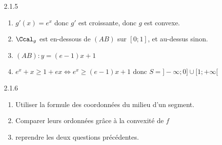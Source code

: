\begin{Solution}{2.1.5}
	\begin{enumerate}
		\item $g'(x)=e^x$ donc $g'$ est croissante, donc $g$ est convexe.
		\item $\Ccal_g$ est en-dessous de $(AB)$ sur $[0;1]$, et au-dessus sinon.
		\item $(AB):y=(e-1)x+1$
		\item $e^x+x\geq1+ex \Leftrightarrow e^x\geq(e-1)x+1$ donc $S=]-\infty;0]\cup[1;+\infty[$
	\end{enumerate}
\end{Solution}
\begin{Indication}{2.1.6}
	\begin{enumerate}
		\item[3.] Utiliser la formule des coordonnées du milieu d'un segment.
		\item[4.] Comparer leurs ordonnées grâce à la convexité de $f$
		\item[5.] reprendre les deux questions précédentes.
	\end{enumerate}
\end{Indication}
